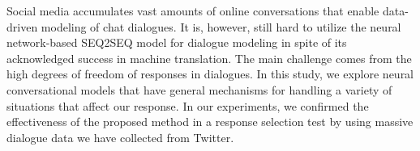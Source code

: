 Social media accumulates vast amounts of online conversations that enable data-driven modeling of chat dialogues. It is, however, still hard to utilize the neural network-based SEQ2SEQ model for dialogue modeling in spite of its acknowledged success in machine translation. The main challenge comes from the high degrees of freedom of responses in dialogues. In this study, we explore neural conversational models that have general mechanisms for handling a variety of situations that affect our response. In our experiments, we confirmed the effectiveness of the proposed method in a response selection test by using massive dialogue data we have collected from Twitter.
